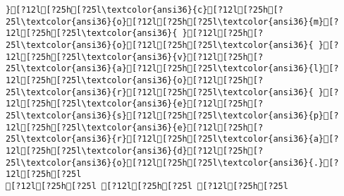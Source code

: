 \documentclass{scrartcl}
\begin{document}
\begin{Verbatim}
}[?12l[?25h[?25l\textcolor{ansi36}{c}[?12l[?25h[?25l\textcolor{ansi36}{o}[?12l[?25h[?25l\textcolor{ansi36}{m}[?12l[?25h[?25l\textcolor{ansi36}{ }[?12l[?25h[?25l\textcolor{ansi36}{o}[?12l[?25h[?25l\textcolor{ansi36}{ }[?12l[?25h[?25l\textcolor{ansi36}{v}[?12l[?25h[?25l\textcolor{ansi36}{a}[?12l[?25h[?25l\textcolor{ansi36}{l}[?12l[?25h[?25l\textcolor{ansi36}{o}[?12l[?25h[?25l\textcolor{ansi36}{r}[?12l[?25h[?25l\textcolor{ansi36}{ }[?12l[?25h[?25l\textcolor{ansi36}{e}[?12l[?25h[?25l\textcolor{ansi36}{s}[?12l[?25h[?25l\textcolor{ansi36}{p}[?12l[?25h[?25l\textcolor{ansi36}{e}[?12l[?25h[?25l\textcolor{ansi36}{r}[?12l[?25h[?25l\textcolor{ansi36}{a}[?12l[?25h[?25l\textcolor{ansi36}{d}[?12l[?25h[?25l\textcolor{ansi36}{o}[?12l[?25h[?25l\textcolor{ansi36}{.}[?12l[?25h[?25l
[?12l[?25h[?25l [?12l[?25h[?25l [?12l[?25h[?25l

\end{Verbatim}
\end{document}
